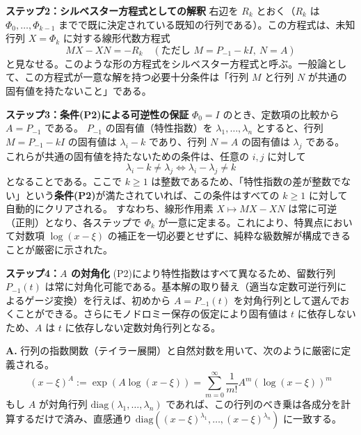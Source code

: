 \begin{Q}[係数行列 $P(x,t)$ が特異点 $x=\xi$ において高々1位の極（フックス型特異点）を持つと仮定したとき、基本解行列が局所表示 $Y(x,t) = \Phi(x,t)(x-\xi)^A G(t)$ を持つことは、具体的にどのように証明（構成）されるか？]
\begin{Q}
\textbf{ステップ2：シルベスター方程式としての解釈}
右辺を $R_k$ とおく（$R_k$ は $\Phi_0, \dots, \Phi_{k-1}$ までで既に決定されている既知の行列である）。この方程式は、未知行列 $X = \Phi_k$ に対する線形代数方程式
\[
  M X - X N = -R_k \quad (\text{ただし } M = P_{-1} - k I, \ N = A)
\]
と見なせる。このような形の方程式をシルベスター方程式と呼ぶ。一般論として、この方程式が一意な解を持つ必要十分条件は「行列 $M$ と行列 $N$ が共通の固有値を持たないこと」である。

\textbf{ステップ3：条件(P2)による可逆性の保証}
$\Phi_0 = I$ のとき、定数項の比較から $A = P_{-1}$ である。
$P_{-1}$ の固有値（特性指数）を $\lambda_1, \dots, \lambda_n$ とすると、行列 $M = P_{-1} - k I$ の固有値は $\lambda_i - k$ であり、行列 $N = A$ の固有値は $\lambda_j$ である。
これらが共通の固有値を持たないための条件は、任意の $i, j$ に対して
\[
  \lambda_i - k \neq \lambda_j \iff \lambda_i - \lambda_j \neq k
\]
となることである。ここで $k \geq 1$ は整数であるため、「特性指数の差が整数でない」という\textbf{条件(P2)}が満たされていれば、この条件はすべての $k \geq 1$ に対して自動的にクリアされる。
すなわち、線形作用素 $X \mapsto MX - XN$ は常に可逆（正則）となり、各ステップで $\Phi_k$ が一意に定まる。これにより、特異点において対数項 $\log(x-\xi)$ の補正を一切必要とせずに、純粋な級数解が構成できることが厳密に示された。

\textbf{ステップ4：$A$ の対角化}
(P2)により特性指数はすべて異なるため、留数行列 $P_{-1}(t)$ は常に対角化可能である。基本解の取り替え（適当な定数可逆行列によるゲージ変換）を行えば、初めから $A = P_{-1}(t)$ を対角行列として選んでおくことができる。さらにモノドロミー保存の仮定により固有値は $t$ に依存しないため、$A$ は $t$ に依存しない定数対角行列となる。
\end{Q}

\begin{Q}
\textbf{A.} 行列の指数関数（テイラー展開）と自然対数を用いて、次のように厳密に定義される。
\[
  (x-\xi)^A := \exp(A \log(x-\xi)) = \sum_{m=0}^{\infty} \frac{1}{m!} A^m (\log(x-\xi))^m
\]
もし $A$ が対角行列 $\mathrm{diag}(\lambda_1, \dots, \lambda_n)$ であれば、この行列のべき乗は各成分を計算するだけで済み、直感通り $\mathrm{diag}((x-\xi)^{\lambda_1}, \dots, (x-\xi)^{\lambda_n})$ に一致する。


\end{Q}
\end{Q}

